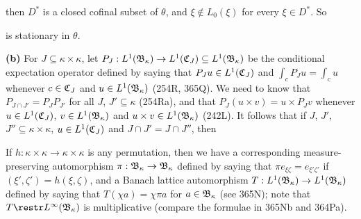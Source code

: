 {

\noindent then $D^*$ is a closed cofinal subset of $\theta$,
and $\xi\notin L_0(\xi)$ for every $\xi\in D^*$.   So


\noindent is stationary in $\theta$.

\medskip

{\bf (b)} For $J\subseteq\kappa\times\kappa$, let
$P_J:L^1(\frak B_{\kappa})
\to L^1(\frak C_J)\subseteq L^1(\frak B_{\kappa})$ be the
conditional expectation operator defined by saying that
$P_Ju\in L^1(\frak C_J)$ and
$\int_cP_Ju=\int_cu$ whenever $c\in\frak C_J$ and
$u\in L^1(\frak B_{\kappa})$ (254R, 365Q).
We need to know that $P_{J\cap J'}=P_JP_{J'}$ for all $J$,
$J'\subseteq\kappa$ (254Ra), and that $P_J(u\times v)=u\times P_Jv$
whenever $u\in L^1(\frak C_J)$,
$v\in L^1(\frak B_{\kappa})$ and $u\times v\in L^1(\frak B_{\kappa})$
(242L).   It follows that if $J$, $J'$,
$J''\subseteq\kappa\times\kappa$, $u\in L^1(\frak C_J)$ and
$J\cap J'=J\cap J''$, then


If $h:\kappa\times\kappa\to\kappa\times\kappa$ is any permutation, then we
have a corresponding measure-preserving automorphism
$\pi:\frak B_{\kappa}\to\frak B_{\kappa}$ defined by saying that
$\pi e_{\xi\zeta}=e_{\xi'\zeta'}$ if $(\xi',\zeta')=h(\xi,\zeta)$, and
a Banach lattice automorphism
$T:L^1(\frak B_{\kappa})\to L^1(\frak B_{\kappa})$ defined by
saying that $T(\chi a)=\chi\pi a$ for $a\in\frak B_{\kappa}$ (see
365N);  
note that $T\restr L^{\infty}(\frak B_{\kappa})$ is multiplicative
(compare the formulae in 365Nb and 364Pa).
%
%

}
